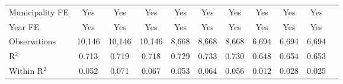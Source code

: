 \documentclass{article}
\begin{document}
\begin{table}[htbp]
\begin{adjustbox}{width=\textwidth}
\begin{tabular}{lcccccccccc}
\midrule
Municipality FE & Yes & Yes & Yes & Yes & Yes & Yes & Yes & Yes & Yes \\
Year FE & Yes & Yes & Yes & Yes & Yes & Yes & Yes & Yes & Yes \\
\midrule
Observations & 10,146 & 10,146 & 10,146 & 8,668 & 8,668 & 8,668 & 6,694 & 6,694 & 6,694 \\
R$^2$ & 0.713 & 0.719 & 0.718 & 0.729 & 0.733 & 0.730 & 0.648 & 0.654 & 0.653 \\
Within R$^2$ & 0.052 & 0.071 & 0.067 & 0.053 & 0.064 & 0.056 & 0.012 & 0.028 & 0.025 \\
\bottomrule
\end{tabular}
\end{adjustbox}
\end{table}
\end{document}
